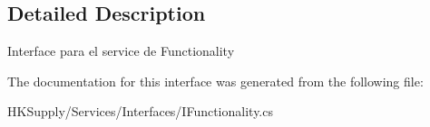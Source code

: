 \subsection{Detailed Description}
Interface para el service de Functionality 



The documentation for this interface was generated from the following file\+:\begin{DoxyCompactItemize}
\item 
H\+K\+Supply/\+Services/\+Interfaces/I\+Functionality.\+cs\end{DoxyCompactItemize}
